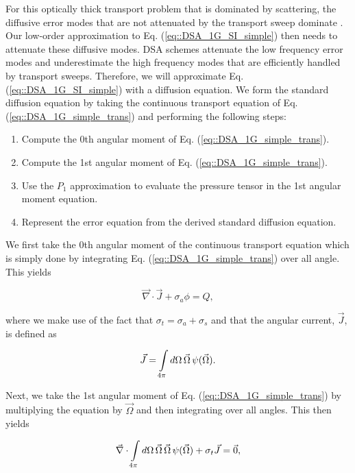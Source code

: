 For this optically thick transport problem that is dominated by scattering, the diffusive error modes that are not attenuated by the transport sweep dominate \cite{ref::adams_larsen_iter_methods}. Our low-order approximation to Eq. (\ref{eq::DSA_1G_SI_simple}) then needs to attenuate these diffusive modes. DSA schemes attenuate the low frequency error modes and underestimate the high frequency modes that are efficiently handled by transport sweeps. Therefore, we will approximate Eq. (\ref{eq::DSA_1G_SI_simple}) with a diffusion equation. We form the standard diffusion equation by taking the continuous transport equation of Eq. (\ref{eq::DSA_1G_simple_trans}) and performing the following steps:

\begin{enumerate}
\item Compute the 0th angular moment of Eq. (\ref{eq::DSA_1G_simple_trans}).
\item Compute the 1st angular moment of Eq. (\ref{eq::DSA_1G_simple_trans}).
\item Use the $P_1$ approximation to evaluate the pressure tensor in the 1st angular moment equation.
\item Represent the error equation from the derived standard diffusion equation.
\end{enumerate}

We first take the 0th angular moment of the continuous transport equation which is simply done by integrating Eq. (\ref{eq::DSA_1G_simple_trans}) over all angle. This yields

\begin{equation}
\label{eq::DSA_1G_0mom}
\vec{\nabla} \cdot \vec{J} + \sigma_a \phi =  Q,
\end{equation}

\noindent where we make use of the fact that $\sigma_t = \sigma_a + \sigma_s $ and that the angular current, $\vec{J}$, is defined as

\begin{equation}
\label{eq::DSA_1G_current}
\vec{J} = \int\displaylimits_{4 \pi}  d \Omega \, \vec{\Omega}\, \psi (\vec{\Omega})   .
\end{equation}

\noindent Next, we take the 1st angular moment of Eq. (\ref{eq::DSA_1G_simple_trans}) by multiplying the equation by $\vec{\Omega}$ and then integrating over all angles. This then yields 

\begin{equation}
\label{eq::DSA_1G_1mom}
\vec{\nabla} \cdot  \int\displaylimits_{4 \pi}  d \Omega \, \vec{\Omega}\, \vec{\Omega} \, \psi (\vec{\Omega}) + \sigma_t \vec{J} = \vec{0},
\end{equation}

